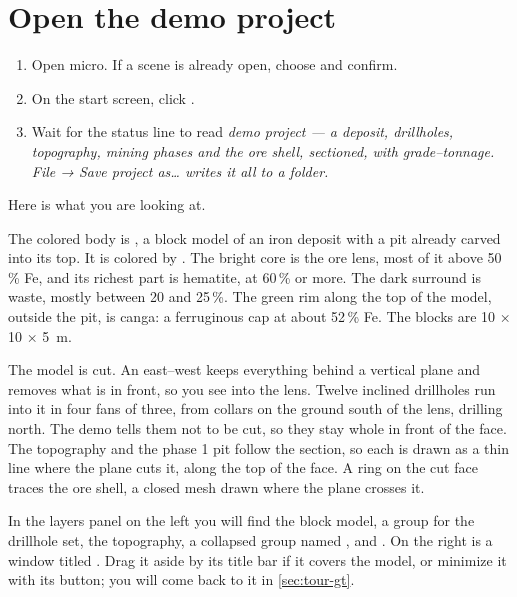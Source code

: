 \section{Open the demo project}\label{sec:tour-open}
\begin{tryit}
\begin{enumerate}
\item Open micro. If a scene is already open, choose  and confirm.
\item On the start screen, click .
\item Wait for the status line to read \emph{demo project — a deposit, drillholes, topography, mining phases and the ore shell, sectioned, with grade–tonnage. File → Save project as… writes it all to a folder.}
\end{enumerate}
\end{tryit}


Here is what you are looking at.

The colored body is , a block model of an iron deposit with a pit already carved into its top. It is colored by . The bright core is the ore lens, most of it above 50\,\% Fe, and its richest part is hematite, at 60\,\% or more. The dark surround is waste, mostly between 20 and 25\,\%. The green rim along the top of the model, outside the pit, is canga: a ferruginous cap at about 52\,\% Fe. The blocks are 10 × 10 × 5~m.

The model is cut. An east–west  keeps everything behind a vertical plane and removes what is in front, so you see into the lens. Twelve inclined drillholes run into it in four fans of three, from collars on the ground south of the lens, drilling north. The demo tells them not to be cut, so they stay whole in front of the face. The topography and the phase 1 pit follow the section, so each is drawn as a thin line where the plane cuts it, along the top of the face. A ring on the cut face traces the ore shell, a closed mesh drawn where the plane crosses it.

In the layers panel on the left you will find the block model, a group for the drillhole set, the topography, a collapsed group named , and . On the right is a window titled . Drag it aside by its title bar if it covers the model, or minimize it with its  button; you will come back to it in \cref{sec:tour-gt}.

